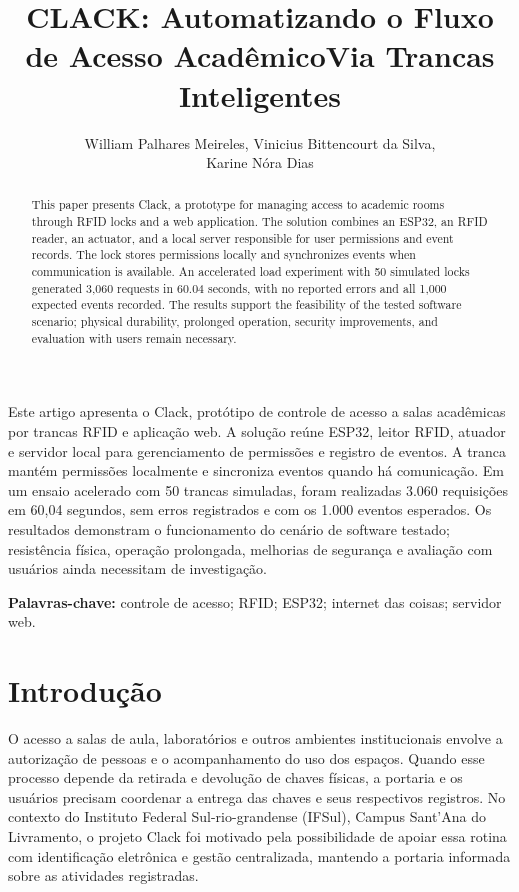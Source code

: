 \documentclass[12pt]{article}
\title{CLACK: Automatizando o Fluxo de Acesso Acadêmico\newline Via Trancas Inteligentes}
\author{William Palhares Meireles\inst{1}, Vinicius Bittencourt da Silva\inst{1},\\
Karine Nóra Dias\inst{1}}
\begin{document}
\maketitle

\begin{abstract}
This paper presents Clack, a prototype for managing access to academic rooms through RFID locks and a web application. The solution combines an ESP32, an RFID reader, an actuator, and a local server responsible for user permissions and event records. The lock stores permissions locally and synchronizes events when communication is available. An accelerated load experiment with 50 simulated locks generated 3,060 requests in 60.04 seconds, with no reported errors and all 1,000 expected events recorded. The results support the feasibility of the tested software scenario; physical durability, prolonged operation, security improvements, and evaluation with users remain necessary.
\end{abstract}

\begin{resumo}
Este artigo apresenta o Clack, protótipo de controle de acesso a salas acadêmicas por trancas RFID e aplicação web. A solução reúne ESP32, leitor RFID, atuador e servidor local para gerenciamento de permissões e registro de eventos. A tranca mantém permissões localmente e sincroniza eventos quando há comunicação. Em um ensaio acelerado com 50 trancas simuladas, foram realizadas 3.060 requisições em 60,04 segundos, sem erros registrados e com os 1.000 eventos esperados. Os resultados demonstram o funcionamento do cenário de software testado; resistência física, operação prolongada, melhorias de segurança e avaliação com usuários ainda necessitam de investigação.
\end{resumo}

\noindent\textbf{Palavras-chave:} controle de acesso; RFID; ESP32; internet das coisas; servidor web.

\section{Introdução}

O acesso a salas de aula, laboratórios e outros ambientes institucionais envolve a autorização de pessoas e o acompanhamento do uso dos espaços. Quando esse processo depende da retirada e devolução de chaves físicas, a portaria e os usuários precisam coordenar a entrega das chaves e seus respectivos registros. No contexto do Instituto Federal Sul-rio-grandense (IFSul), Campus Sant'Ana do Livramento, o projeto Clack foi motivado pela possibilidade de apoiar essa rotina com identificação eletrônica e gestão centralizada, mantendo a portaria informada sobre as atividades registradas.
\end{document}
